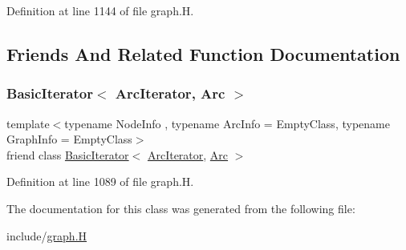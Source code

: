 Definition at line 1144 of file graph.\+H.



\subsection{Friends And Related Function Documentation}
\mbox{\label{class_designar_1_1_graph_1_1_arc_iterator_a530ad7c7218fa9b74a5cce004d0e3a1c}} 
\subsubsection{\texorpdfstring{Basic\+Iterator$<$ Arc\+Iterator, Arc $>$}{BasicIterator< ArcIterator, Arc >}}
{\footnotesize\ttfamily template$<$typename Node\+Info , typename Arc\+Info  = Empty\+Class, typename Graph\+Info  = Empty\+Class$>$ \\
friend class \hyperlink{class_designar_1_1_basic_iterator}{Basic\+Iterator}$<$ \hyperlink{class_designar_1_1_graph_1_1_arc_iterator}{Arc\+Iterator}, \hyperlink{class_designar_1_1_graph_a74c730ef4ce2d20f998d72bd25c2b5bf}{Arc} $>$\hspace{0.3cm}{\ttfamily [friend]}}



Definition at line 1089 of file graph.\+H.



The documentation for this class was generated from the following file\+:\begin{DoxyCompactItemize}
\item 
include/\hyperlink{graph_8_h}{graph.\+H}\end{DoxyCompactItemize}
